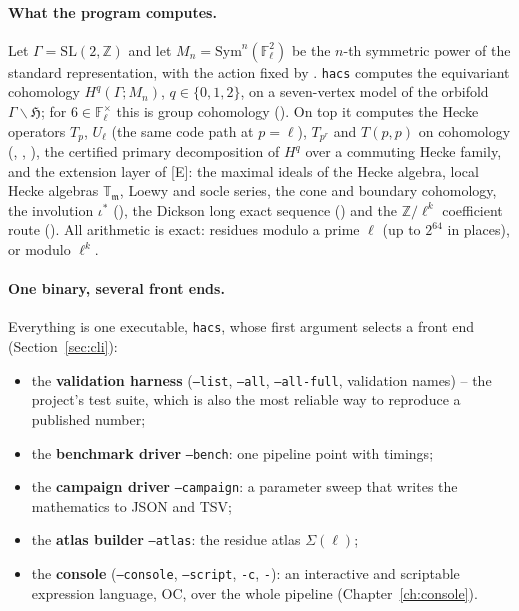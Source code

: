 \documentclass[11pt,openany]{report}
\newcommand{\Z}{\mathbb{Z}}
\newcommand{\Fl}{\mathbb{F}_{\ell}}
\newcommand{\Sym}{\mathrm{Sym}}
\newcommand{\SL}{\mathrm{SL}}
\newcommand{\Ecite}[1]{{\ttfamily[E,~#1]}}
\newcommand{\app}{\texttt{hacs}}
\newcommand{\cli}[1]{\texttt{#1}}
\begin{document}
\paragraph{What the program computes.}
Let $\Gamma=\SL(2,\Z)$ and let $M_n=\Sym^n(\Fl^2)$ be the $n$-th symmetric power of the standard
representation, with the action fixed by {}. \app{} computes the equivariant
cohomology $H^q(\Gamma; M_n)$, $q\in\{0,1,2\}$, on a seven-vertex model of the orbifold
$\Gamma\backslash\mathfrak{H}$; for $6\in\Fl^\times$ this is group cohomology
({}). On top it computes the Hecke operators $T_p$, $U_\ell$ (the same code
path at $p=\ell$), $T_{p^r}$ and $T(p,p)$ on cohomology ({},
{}, {}), the certified primary decomposition of
$H^q$ over a commuting Hecke family, and the extension layer of [E]: the maximal ideals of the Hecke
algebra, local Hecke algebras $\mathbb{T}_\mathfrak{m}$, Loewy and socle series, the cone and boundary
cohomology, the involution $\iota^*$ ({}), the Dickson long exact sequence
(\Ecite{sec:thetaobj}) and the $\Z/\ell^k$ coefficient route (\Ecite{sec:ring}).
All arithmetic is exact: residues modulo a prime $\ell$ (up to $2^{64}$ in places), or modulo $\ell^k$.

\paragraph{One binary, several front ends.}
Everything is one executable, \app, whose first argument selects a front end
(Section~\ref{sec:cli}):
\begin{itemize}[nosep]
\item the \textbf{validation harness} (\cli{--list}, \cli{--all}, \cli{--all-full}, validation names) --
  the project's test suite, which is also the most reliable way to reproduce a published number;
\item the \textbf{benchmark driver} \cli{--bench}: one pipeline point with timings;
\item the \textbf{campaign driver} \cli{--campaign}: a parameter sweep that writes the mathematics to
  JSON and TSV;
\item the \textbf{atlas builder} \cli{--atlas}: the residue atlas $\Sigma(\ell)$;
\item the \textbf{console} (\cli{--console}, \cli{--script}, \cli{-c}, \cli{-}): an interactive and
  scriptable expression language, OC, over the whole pipeline (Chapter~\ref{ch:console}).
\end{itemize}
\end{document}
